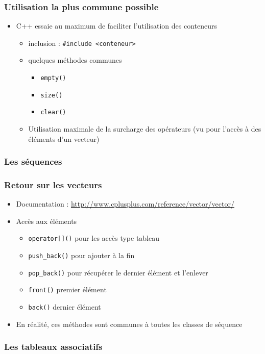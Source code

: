 \begin{frame}[fragile]\frametitle{Utilisation la plus commune possible}
\begin{itemize}
\item C++ essaie au maximum de faciliter l'utilisation des conteneurs
\begin{itemize}
\item inclusion : \verb|#include <conteneur>|
\item quelques méthodes communes
\begin{itemize}
\item \verb|empty()|
\item \verb|size()|
\item \verb|clear()|
\end{itemize}
\item Utilisation maximale de la surcharge des opérateurs (vu pour l'accès à des éléments d'un vecteur)
\end{itemize}
\end{itemize}
\end{frame}

\subsubsection{Les séquences}

\begin{frame}[fragile]\frametitle{Retour sur les vecteurs}
\begin{itemize}
\item Documentation : \url{http://www.cplusplus.com/reference/vector/vector/}
\item Accès aux éléments
\begin{itemize}
\item \verb|operator[]()| pour les accès type tableau
\item \verb|push_back()| pour ajouter à la fin
\item \verb|pop_back()| pour récupérer le dernier élément et l'enlever
\item \verb|front()| premier élément
\item \verb|back()| dernier élément
\end{itemize}
\item En réalité, ces méthodes sont communes à toutes les classes de séquence
\end{itemize}
\end{frame}

\subsubsection{Les tableaux associatifs}

